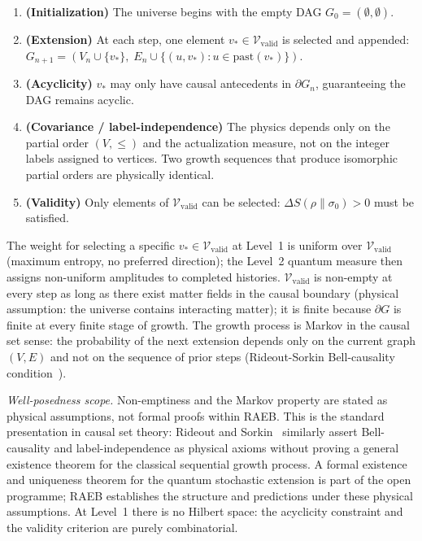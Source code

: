\documentclass[11pt,a4paper]{article}
\theoremstyle{plain}
\theoremstyle{definition}
\theoremstyle{remark}
\newcommand{\Vvalid}{\mathcal{V}_{\mathrm{valid}}}
\begin{document}
\begin{enumerate}[noitemsep,label=\textbf{R\arabic*.}]
  \item \textbf{(Initialization)} The universe begins with the empty DAG
    $G_0 = (\emptyset, \emptyset)$.
  \item \textbf{(Extension)} At each step, one element $v_* \in \Vvalid$ is
    selected and appended: $G_{n+1} = (V_n \cup \{v_*\},\; E_n \cup
    \{(u, v_*) : u \in \mathrm{past}(v_*)\})$.
  \item \textbf{(Acyclicity)} $v_*$ may only have causal antecedents in
    $\partial G_n$, guaranteeing the DAG remains acyclic.
  \item \textbf{(Covariance / label-independence)} The physics depends only
    on the partial order $(V, \leq)$ and the actualization measure, not on
    the integer labels assigned to vertices. Two growth sequences that produce
    isomorphic partial orders are physically identical.
  \item \textbf{(Validity)} Only elements of $\Vvalid$ can be selected:
    $\Delta S(\rho\|\sigma_0) > 0$ must be satisfied.
\end{enumerate}

The weight for selecting a specific $v_* \in \Vvalid$ at Level~1 is uniform
over $\Vvalid$ (maximum entropy, no preferred direction); the Level~2 quantum
measure then assigns non-uniform amplitudes to completed histories.
$\Vvalid$ is non-empty at every step as long as there exist matter fields
in the causal boundary (physical assumption: the universe contains
interacting matter); it is finite because $\partial G$ is finite
at every finite stage of growth. The growth process is Markov in the
causal set sense: the probability of the next extension depends only on
the current graph $(V, E)$ and not on the sequence of prior steps
(Rideout-Sorkin Bell-causality condition~\citep{RideoutSorkin2000}).

\noindent\textit{Well-posedness scope.} Non-emptiness and the Markov property
are stated as physical assumptions, not formal proofs within RAEB.
This is the standard presentation in causal set theory: Rideout and
Sorkin~\citep{RideoutSorkin2000} similarly assert Bell-causality and
label-independence as physical axioms without proving a general existence
theorem for the classical sequential growth process.
A formal existence and uniqueness theorem for the quantum stochastic
extension is part of the open programme; RAEB establishes the structure
and predictions under these physical assumptions.
At Level~1 there is no Hilbert space: the acyclicity constraint and the
validity criterion are purely combinatorial.
\end{document}
